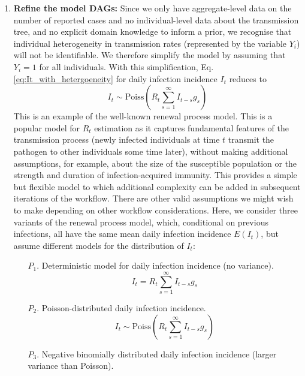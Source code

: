 \documentclass{article}
\begin{document}
\begin{enumerate}
\item \textbf{Refine the model DAGs:} Since we only have aggregate-level data on the number of reported cases and no individual-level data about the transmission tree, and no explicit domain knowledge to inform a prior, we recognise that individual heterogeneity in transmission rates (represented by the variable $Y_i$) will not be identifiable. We therefore simplify the model by assuming that $Y_i=1$ for all individuals. With this simplification, Eq. \eqref{eq:It_with_hetergoeneity} for daily infection incidence $I_t$ reduces to
    \begin{equation} 
        I_t \sim \mathrm{Poiss}\left( R_t \sum_{s=1}^\infty I_{t-s}g_s  \right)
    \end{equation}
    This is an example of the well-known renewal process model. This is a popular model for $R_t$ estimation as it captures fundamental features of the transmission process (newly infected individuals at time $t$ transmit the pathogen to other individuals some time later), without making additional assumptions, for example, about the size of the susceptible population or the strength and duration of infection-acquired immunity. This provides a simple but flexible model to which additional complexity can be added in subsequent iterations of the workflow.
    There are other valid assumptions we might wish to make depending on other workflow considerations. Here, we consider three variants of the renewal process model, which, conditional on previous infections, all have the same mean daily infection incidence $E(I_t)$, but assume different models for the distribution of $I_t$:
    \begin{itemize}
    \item[$P_1$.] Deterministic model for daily infection incidence (no variance).
    \begin{equation} \label{eq:infections_P1}
        I_t = R_t \sum_{s=1}^\infty I_{t-s}g_s 
    \end{equation}
    \item[$P_2$.] Poisson-distributed daily infection incidence.
        \begin{equation} \label{eq:infections_P2}
        I_t \sim \mathrm{Poiss}\left( R_t \sum_{s=1}^\infty I_{t-s}g_s  \right)
    \end{equation}
    \item[$P_3$.] Negative binomially distributed daily infection incidence (larger variance than Poisson). 
            \begin{equation} \label{eq:infections_P3}

\end{equation}
\end{itemize}
\end{enumerate}
\end{document}
